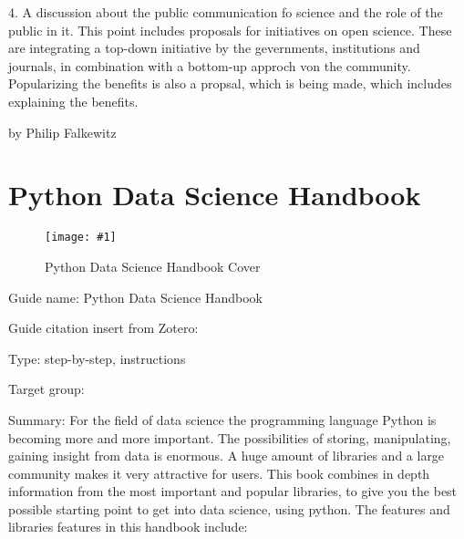 \documentclass{article}
\newlength{\imgwidth}
\newcommand\scaledgraphics[2]{%
                
\settowidth{\imgwidth}{\texttt{[image: \#1]}}%
                
\setlength{\imgwidth}{\minof{\imgwidth}{#2\textwidth}}%
                
\texttt{[image: \#1]}%
                
}
\begin{document}
4. A discussion about the public communication fo science and the role of the public in it. This point includes proposals for initiatives on open science. These are integrating a top-down initiative by the gevernments, institutions and journals, in combination with a bottom-up approch von the community. Popularizing the benefits is also a propsal, which is being made, which includes explaining the benefits.





by Philip Falkewitz





\section{Python Data Science Handbook}\label{H8115129}



\begin{center}
\begin{figure}
\scaledgraphics{43052757-2454-42ab-a98c-c7977cb4e249.png}{0.5}
\caption*{Python Data Science Handbook Cover}\label{F16921711}
\end{figure}


\end{center}


Guide name: Python Data Science Handbook


Guide citation insert from Zotero: \autocite{vanderplas_python_2016}


Type: step-by-step, instructions


Target group:


Summary: For the field of data science the programming language Python is becoming more and more important. The possibilities of storing, manipulating, gaining insight from data is enormous. A huge amount of libraries and a large community makes it very attractive for users. This book combines in depth information from the most important and popular libraries, to give you the best possible starting point to get into data science, using python. The features and libraries features in this handbook include: 
\end{document}
